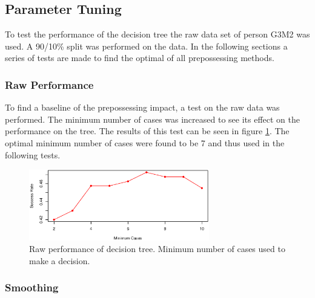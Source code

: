 \subsection{Parameter Tuning}

To test the performance of the decision tree the raw data set of person G3M2 was used.
A 90/10\% split was performed on the data.
In the following sections a series of tests are made to find the optimal of all prepossessing methods.

% 
% 
% 
% 
% 
% 

\subsubsection{Raw Performance}

To find a baseline of the prepossessing impact, a test on the raw data was performed.
The minimum number of cases was increased to see its effect on the performance on the tree.
The results of this test can be seen in figure \ref{fig:tree_raw}. 
The optimal minimum number of cases were found to be 7 and thus used in the following tests.

\begin{figure}[H]
\centering
\includegraphics[width=0.7\textwidth]{graphics/tree_raw}
\caption{Raw performance of decision tree. Minimum number of cases used to make a decision. }%
\label{fig:tree_raw}
\end{figure}


\subsubsection{Smoothing}

